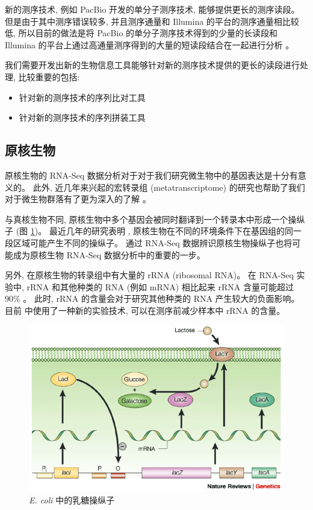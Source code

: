 新的测序技术, 例如 PacBio 开发的单分子测序技术, 能够提供更长的测序读段。 
但是由于其中测序错误较多, 并且测序通量和 Illumina 的平台的测序通量相比较低, 
所以目前的做法是将 PacBio 的单分子测序技术得到的少量的长读段和 Illumina 
的平台上通过高通量测序得到的大量的短读段结合在一起进行分析 \cite{hybrid.rna.seq.2012}。 

我们需要开发出新的生物信息工具能够针对新的测序技术提供的更长的读段进行处理, 
比较重要的包括: 
\begin{itemize}
\item 针对新的测序技术的序列比对工具

\item 针对新的测序技术的序列拼装工具
\end{itemize}

\subsection{原核生物}
原核生物的 RNA-Seq 数据分析对于对于我们研究微生物中的基因表达是十分有意义的。 
此外, 近几年来兴起的宏转录组 (metatranscriptome) 的研究也帮助了我们对于微生物群落有了更为深入的了解
\cite{gilbert2008detection, urich2008simultaneous, gifford2010quantitative, 
helbling2011activity, mason2012metagenome, huson2011integrative, 
lesniewski2012metatranscriptome}。 

\nocite{sorek2009prokaryotic}

与真核生物不同, 原核生物中多个基因会被同时翻译到一个转录本中形成一个操纵子 
(图 \ref{e.coli.lactose.operon})。 
最近几年的研究表明 \cite{MarcGuell11272009, koide2009prevalence}, 
原核生物在不同的环境条件下在基因组的同一段区域可能产生不同的操纵子。 
通过 RNA-Seq 数据辨识原核生物操纵子也将可能成为原核生物 RNA-Seq 数据分析中的重要的一步。 

另外, 在原核生物的转录组中有大量的 rRNA (ribosomal RNA)。  
在 RNA-Seq 实验中, 
rRNA 和其他种类的 RNA (例如 mRNA) 相比起来 rRNA 含量可能超过 
90\% \cite{giannoukos2012efficient}。 
此时, rRNA 的含量会对于研究其他种类的 RNA 产生较大的负面影响。 
目前  中使用了一种新的实验技术, 
可以在测序前减少样本中 rRNA 的含量。 

\begin{figure}[!t]
\centering
\includegraphics[width=\textwidth]{figures/disc/e-coli-lactose-operon.png}
\caption{\textit{E. coli} 中的乳糖操纵子 \cite{shuman2003art}}
\label{e.coli.lactose.operon}
\end{figure}


